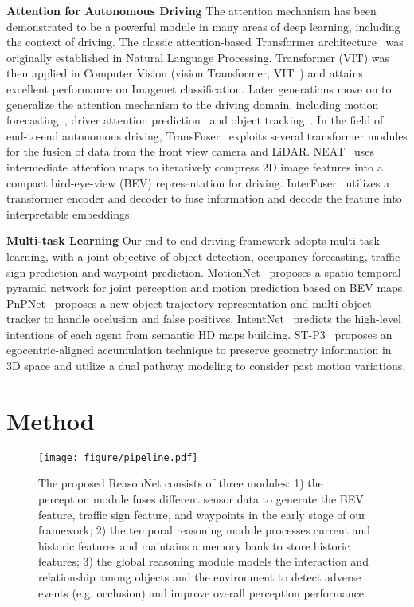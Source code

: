 \documentclass[10pt,twocolumn,letterpaper]{article}
\begin{document}
\noindent\textbf{Attention for Autonomous Driving}
The attention mechanism has been demonstrated to be a powerful module in many areas of deep learning, including the context of driving. The classic attention-based Transformer architecture~\cite{vaswani2017attention} was originally established in Natural Language Processing. Transformer (VIT) was then applied in Computer Vision (vision Transformer, VIT~\cite{dosovitskiy2020image, qian2021blending}) and attains excellent performance on Imagenet classification.
Later generations move on to generalize the attention mechanism to the driving domain, including motion forecasting~\cite{li2020end,gao2020vectornet,wang2021hierarchical}, driver attention prediction~\cite{gou2022driver, kim2019grounding} and object tracking~\cite{sun2020transtrack, meinhardt2022trackformer}. In the field of end-to-end autonomous driving, TransFuser~\cite{prakash2021multi, chitta2022transfuser} exploits several transformer modules for the fusion of data from the front view camera and LiDAR.  NEAT~\cite{chitta2021neat} uses intermediate attention maps to iteratively compress 2D image features into a compact bird-eye-view (BEV) representation for driving.  InterFuser~\cite{shao2022safety} utilizes a transformer encoder and decoder to fuse information and decode the feature into interpretable embeddings. 

\noindent\textbf{Multi-task Learning} Our end-to-end driving framework adopts multi-task learning, with a joint objective of object detection, occupancy forecasting, traffic sign prediction and waypoint prediction. MotionNet~\cite{wu2020motionnet} proposes a spatio-temporal pyramid network  for joint perception and motion prediction based on BEV maps. PnPNet~\cite{liang2020pnpnet} proposes a new object trajectory representation and multi-object tracker to handle occlusion and false positives. IntentNet~\cite{casas2018intentnet} predicts the high-level intentions of each agent from semantic HD maps building. ST-P3~\cite{hu2022st} proposes an egocentric-aligned accumulation technique to preserve geometry information in 3D space and utilize a dual pathway modeling to consider past motion variations.


\section{Method}
\label{sec: method}
\begin{figure*}[t]
    \centering
    \texttt{[image: figure/pipeline.pdf]}
    \vspace{-0.5em}
    \caption{The proposed ReasonNet consists of three modules: 1) the perception module fuses  different sensor data to generate the BEV feature, traffic sign feature, and waypoints in the early stage of our framework; 2) the temporal reasoning module processes current and historic features and maintains a memory bank to store historic features; 3) the global reasoning module models the interaction and relationship among objects and the environment to detect adverse events (e.g. occlusion) and improve overall perception performance.}
    \label{fig:pipeline}
    \vspace{-1em}
\end{figure*}
\end{document}
